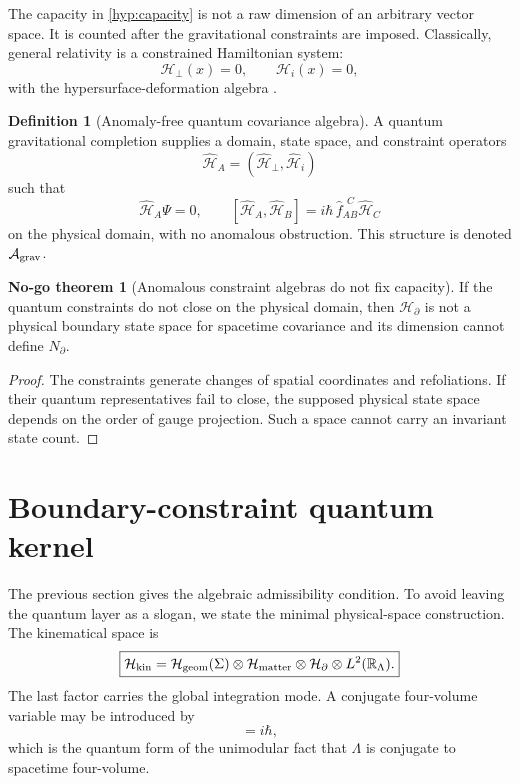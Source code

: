 \documentclass[aps,prd,reprint,nofootinbib,superscriptaddress,floatfix]{revtex4-2}
\numberwithin{equation}{section}
\theoremstyle{definition}
\newtheorem{definition}{Definition}[section]
\newtheorem{nogotheorem}{No-go theorem}[section]
\theoremstyle{plain}
\newcommand{\R}{\mathbb R}
\newcommand{\Agrav}{\mathcal A_{\rm grav}}
\newcommand{\Ncap}{N_{\partial}}
\newcommand{\Hkin}{\mathcal H_{\rm kin}}
\newcommand{\Hbd}{\mathcal H_{\partial}}
\newcommand{\Tfour}{\mathcal T_4}
\begin{document}
The capacity in \cref{hyp:capacity} is not a raw dimension of an arbitrary vector space.  It is counted after the gravitational constraints are imposed.  Classically, general relativity is a constrained Hamiltonian system:
\begin{equation}
\mathcal H_\perp(x)=0,
\qquad
\mathcal H_i(x)=0,
\end{equation}
with the hypersurface-deformation algebra \cite{Dirac1958,ADM1962,HenneauxTeitelboim1992,Dirac1964}.

\begin{definition}[Anomaly-free quantum covariance algebra]\label{def:agrav}
A quantum gravitational completion supplies a domain, state space, and constraint operators
\begin{equation}
\widehat{\mathcal H}_A=(\widehat{\mathcal H}_\perp,\widehat{\mathcal H}_i)
\end{equation}
such that
\begin{equation}
\boxed{
\widehat{\mathcal H}_A\Psi=0,
\qquad
[\widehat{\mathcal H}_A,\widehat{\mathcal H}_B]
=
i\hbar\,\widehat f_{AB}^{\ \ C}\widehat{\mathcal H}_C
}
\end{equation}
on the physical domain, with no anomalous obstruction.  This structure is denoted \(\Agrav\).
\end{definition}

\begin{nogotheorem}[Anomalous constraint algebras do not fix capacity]\label{nogo:anomaly}
If the quantum constraints do not close on the physical domain, then \(\mathcal H_\partial\) is not a physical boundary state space for spacetime covariance and its dimension cannot define \(\Ncap\).
\end{nogotheorem}

\begin{proof}
The constraints generate changes of spatial coordinates and refoliations.  If their quantum representatives fail to close, the supposed physical state space depends on the order of gauge projection.  Such a space cannot carry an invariant state count.
\end{proof}


\section{Boundary-constraint quantum kernel}\label{sec:quantum-kernel}

The previous section gives the algebraic admissibility condition.  To avoid leaving the quantum layer as a slogan, we state the minimal physical-space construction.  The kinematical space is
\begin{equation}
\boxed{
\Hkin=
\mathcal H_{\rm geom}(\Sigma)
\otimes
\mathcal H_{\rm matter}
\otimes
\Hbd
\otimes
L^2(\R_\Lambda).
}
\end{equation}
The last factor carries the global integration mode.  A conjugate four-volume variable may be introduced by
\begin{equation}
[\widehat{\Tfour},\widehat\Lambda]=i\hbar,
\end{equation}
which is the quantum form of the unimodular fact that \(\Lambda\) is conjugate to spacetime four-volume.
\end{document}
